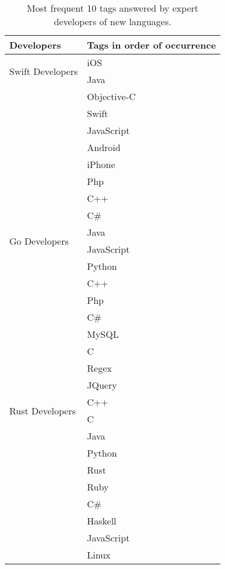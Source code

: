 \begin{table}
\begin{center}
\begin{tabular}{|l|l|}
    \hline
    Developers & Tags in order of occurrence\\ \hline
    
    \multirow{2}{*}{Swift Developers}
    &iOS\\&Java\\&Objective-C\\&Swift\\&JavaScript\\&Android\\&iPhone\\&Php\\&C++\\&C\# \\ \hline
    
    \multirow{2}{*}{Go Developers}
    &Java  \\ &JavaScript\\ &Python \\&C++\\&Php\\&C\#\\&MySQL\\&C\\&Regex\\&JQuery \\ \hline
    
    \multirow{2}{*}{Rust Developers}
    &C++\\&C\\&Java\\&Python \\& Rust\\ &Ruby\\ &C\# \\ &Haskell \\ &JavaScript 	\\ &Linux\\ \hline
    


\end{tabular}
\end{center}
\caption{Most frequent 10 tags answered by expert developers of new languages.}
\label{table:Dev skills}
\end{table}